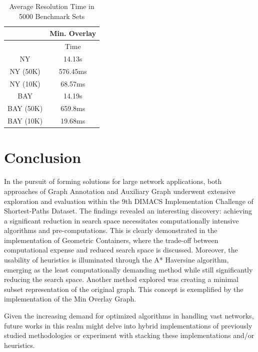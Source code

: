 \documentclass{article}
\begin{document}
\begin{table}
    \centering
    \begin{tabular}{cc}
 &Min. Overlay\\
 \hline
         & Time\\
          \hline
         NY& 14.13s\\
         NY (50K)& 576.45ms\\
         NY (10K)& 68.57ms\\
          \hline
         BAY& 14.19s\\
         BAY (50K)& 659.8ms\\
         BAY (10K)& 19.68ms\\
          \hline
    \end{tabular}
    \caption{Average Resolution Time in 5000 Benchmark Sets}
    \label{tab:avgres}
\end{table}


\section{Conclusion}

In the pursuit of forming solutions for large network applications, both approaches of Graph Annotation and Auxiliary Graph underwent extensive exploration and evaluation within the 9th DIMACS Implementation Challenge of Shortest-Paths Dataset. The findings revealed an interesting discovery: achieving a significant reduction in search space necessitates computationally intensive algorithms and pre-computations. This is clearly demonstrated in the implementation of Geometric Containers, where the trade-off between computational expense and reduced search space is discussed. Moreover, the usability of heuristics is illuminated through the A* Haversine algorithm, emerging as the least computationally demanding method while still significantly reducing the search space. Another method explored was creating a minimal subset representation of the original graph. This concept is exemplified by the implementation of the Min Overlay Graph.

Given the increasing demand for optimized algorithms in handling vast networks, future works in this realm might delve into hybrid implementations of previously studied methodologies or experiment with stacking these implementations and/or heuristics.

\end{document}
